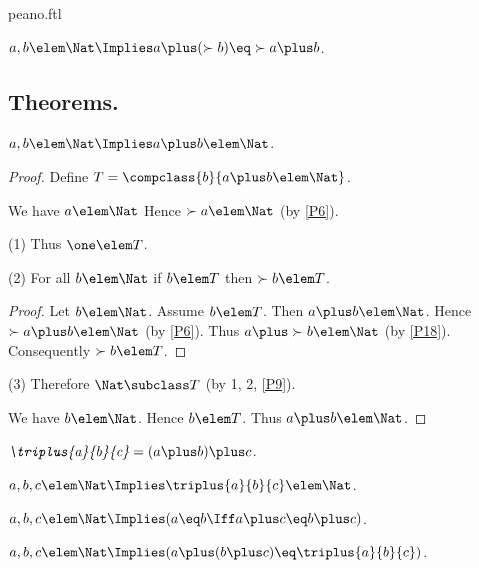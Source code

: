\documentclass{article}
\begin{document}
\begin{smodule}{peano.ftl}
\begin{forthel}
  \begin{axiom*}[title=18,id=P18]
    $a,b \elem \Nat \Implies a \plus (\succ{b}) \eq \succ{a \plus b}$.
  \end{axiom*}
\end{forthel}


\subsection{Theorems.}

\begin{forthel}
  \begin{theorem*}[title=19,id=P19]
    $a,b \elem \Nat \Implies a \plus b \elem \Nat$.
  \end{theorem*}
  \begin{proof}
    Define $T = \compclass{b}{a \plus b \elem \Nat}$.
    
    We have $a \elem \Nat$
    Hence $\succ{a} \elem \Nat$ (by \ref{P6}).
    
    (1) Thus $\one \elem T$.

    (2) For all $b \elem \Nat$ if $b \elem T$ then $\succ{b} \elem T$.
    \begin{proof}
      Let $b \elem \Nat$.
      Assume $b \elem T$.
      Then $a \plus b \elem \Nat$.
      Hence $\succ{a \plus b} \elem \Nat$ (by \ref{P6}).
      Thus $a \plus \succ{b} \elem \Nat$ (by \ref{P18}).
      Consequently $\succ{b} \elem T$.
    \end{proof}

    (3) Therefore $\Nat \subclass T$ (by 1, 2, \ref{P9}).

    We have $b \elem \Nat$.
    Hence $b \elem T$.
    Thus $a \plus b \elem \Nat$.
  \end{proof}

  \begin{definition*}[title=20,id=P20]
    $\emph{\triplus{a}{b}{c}} = (a \plus b) \plus c$.
  \end{definition*}

  \begin{theorem*}[title=21,id=P21]
    $a,b,c \elem \Nat \Implies \triplus{a}{b}{c} \elem \Nat$.
  \end{theorem*}

  \begin{theorem*}[title=22,id=P22]
    $a,b,c \elem \Nat \Implies (a \eq b \Iff a \plus c \eq b \plus c)$.
  \end{theorem*}

  \begin{theorem*}[title=23,id=P23]
    $a,b,c \elem \Nat \Implies (a \plus (b \plus c) \eq \triplus{a}{b}{c})$.
  \end{theorem*}


\end{forthel}
\end{smodule}
\end{document}

